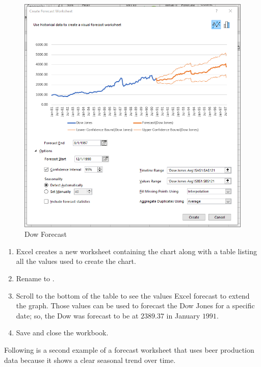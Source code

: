 \begin{figure}[H]
	\centering
	\includegraphics[width=\maxwidth{.95\linewidth}]{gfx/ch08_fig12}
	\caption{Dow Forecast}
	\label{08:fig12}
\end{figure}

\begin{enumerate}[resume]
	\item Excel creates a new worksheet containing the chart along with a table listing all the values used to create the chart.
	\item Rename  to .
	\item Scroll to the bottom of the table to see the values Excel forecast to extend the graph. Those values can be used to forecast the Dow Jones for a specific date; so, the Dow was forecast to be at $ 2389.37 $ in January $ 1991 $.
	\item Save and close the  workbook.
\end{enumerate}

Following is a second example of a forecast worksheet that uses beer production data because it shows a clear seasonal trend over time.


